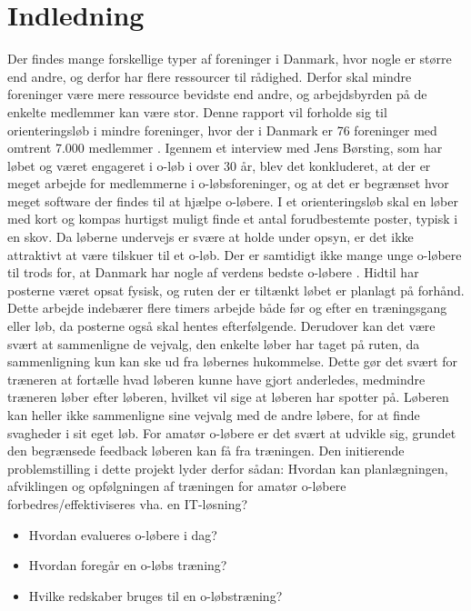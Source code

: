 \chapter{Indledning}
Der findes mange forskellige typer af foreninger i Danmark, hvor nogle er større end andre, og derfor har flere ressourcer til rådighed. Derfor skal mindre foreninger være mere ressource bevidste end andre, og arbejdsbyrden på de enkelte medlemmer kan være stor.\newline
Denne rapport vil forholde sig til orienteringsløb i mindre foreninger, hvor der i Danmark er 76 foreninger med omtrent 7.000 medlemmer \citep{DIF}. Igennem et interview med Jens Børsting, som har løbet og været engageret i o-løb i over 30 år, blev det konkluderet, at der er meget arbejde for medlemmerne i o-løbsforeninger, og at det er begrænset hvor meget software der findes til at hjælpe o-løbere. \newline
I et orienteringsløb skal en løber med kort og kompas hurtigst muligt finde et antal forudbestemte poster, typisk i en skov. Da løberne undervejs er svære at holde under opsyn, er det ikke attraktivt at være tilskuer til et o-løb. Der er samtidigt ikke mange unge o-løbere til trods for, at Danmark har nogle af verdens bedste o-løbere \citep{RANK}. \newline
Hidtil har posterne været opsat fysisk, og ruten der er tiltænkt løbet er planlagt på forhånd. Dette arbejde indebærer flere timers arbejde både før og efter en træningsgang eller løb, da posterne også skal hentes efterfølgende. Derudover kan det være svært at sammenligne de vejvalg, den enkelte løber har taget på ruten, da sammenligning kun kan ske ud fra løbernes hukommelse. Dette gør det svært for træneren at fortælle hvad løberen kunne have gjort anderledes, medmindre træneren løber efter løberen, hvilket vil sige at løberen har spotter på. Løberen kan heller ikke sammenligne sine vejvalg med de andre løbere, for at finde svagheder i sit eget løb.\newline 
For amatør o-løbere er det svært at udvikle sig, grundet den begrænsede feedback løberen kan få fra træningen.\newline
Den initierende problemstilling i dette projekt lyder derfor sådan:\newline
Hvordan kan planlægningen, afviklingen og opfølgningen af træningen for amatør o-løbere forbedres/effektiviseres vha. en IT-løsning?
\begin{itemize}
	\item Hvordan evalueres o-løbere i dag?
	\item Hvordan foregår en o-løbs træning? 
	\item Hvilke redskaber bruges til en o-løbstræning?	
\end{itemize} 
